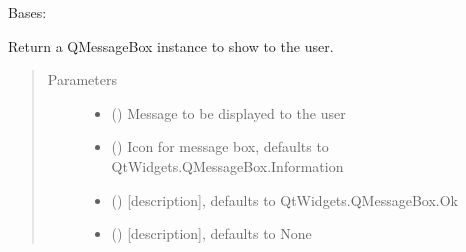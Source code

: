 \documentclass[letterpaper,10pt,english]{sphinxmanual}
\begin{document}
\begin{fulllineitems}
\label{\detokenize{polo.utils:polo.utils.io_utils.RunSerializer}}
Bases: 

\begin{fulllineitems}
\label{\detokenize{polo.utils:polo.utils.io_utils.RunSerializer.make_message_box}}
Return a QMessageBox instance to show to the user.
\begin{quote}\begin{description}
\item[{Parameters}] \leavevmode\begin{itemize}
\item {} 
 () \textendash{} Message to be displayed to the user

\item {} 
 (\sphinxstyleliteralemphasis{\sphinxupquote{, }}) \textendash{} Icon for message box, defaults to QtWidgets.QMessageBox.Information

\item {} 
 (\sphinxstyleliteralemphasis{\sphinxupquote{{[}}}\sphinxstyleliteralemphasis{\sphinxupquote{{]}}}\sphinxstyleliteralemphasis{\sphinxupquote{, }}) \textendash{} {[}description{]}, defaults to QtWidgets.QMessageBox.Ok

\item {} 
 (\sphinxstyleliteralemphasis{\sphinxupquote{{[}}}\sphinxstyleliteralemphasis{\sphinxupquote{{]}}}\sphinxstyleliteralemphasis{\sphinxupquote{, }}) \textendash{} {[}description{]}, defaults to None


\end{itemize}
\end{description}
\end{quote}
\end{fulllineitems}
\end{fulllineitems}
\end{document}
